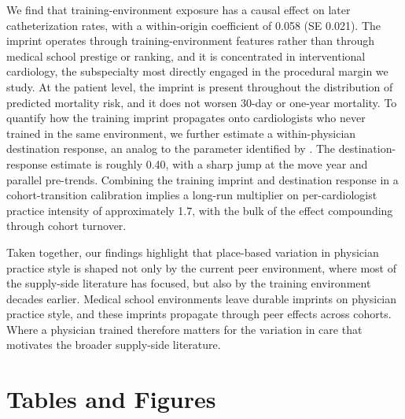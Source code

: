 \documentclass[12pt]{article}
\let\textcite\citet
\begin{document}
We find that training-environment exposure has a causal effect on later catheterization rates, with a within-origin coefficient of 0.058 (SE 0.021). The imprint operates through training-environment features rather than through medical school prestige or ranking, and it is concentrated in interventional cardiology, the subspecialty most directly engaged in the procedural margin we study. At the patient level, the imprint is present throughout the distribution of predicted mortality risk, and it does not worsen 30-day or one-year mortality. To quantify how the training imprint propagates onto cardiologists who never trained in the same environment, we further estimate a within-physician destination response, an analog to the parameter identified by \textcite{molitor2018}. The destination-response estimate is roughly 0.40, with a sharp jump at the move year and parallel pre-trends. Combining the training imprint and destination response in a cohort-transition calibration implies a long-run multiplier on per-cardiologist practice intensity of approximately 1.7, with the bulk of the effect compounding through cohort turnover.

Taken together, our findings highlight that place-based variation in physician practice style is shaped not only by the current peer environment, where most of the supply-side literature has focused, but also by the training environment decades earlier. Medical school environments leave durable imprints on physician practice style, and these imprints propagate through peer effects across cohorts. Where a physician trained therefore matters for the variation in care that motivates the broader supply-side literature.

\clearpage

\begin{singlespace}


\end{singlespace}

\clearpage

\section*{Tables and Figures}

\begin{table}[!h]
\centering
\begin{minipage}[h]{\textwidth}
  \caption[Summary Statistics]{\textbf{Summary Statistics}\footnote{Cardiologist-year observations from the 2008--2018 Medicare fee-for-service panel, restricted to cardiologists treating at least 11 NSTEMI patients in a given year and to graduation cohorts 1983--2006. The residualized cath rate is the volume-weighted mean of patient-level residuals from a linear probability model regressing an indicator for catheterization within two days of NSTEMI admission on age, sex, race, dual eligibility, the 31 Elixhauser comorbidities, and year fixed effects.}}
  \label{tab:summ}
  \centering
  
\end{minipage}
\end{table}
\end{document}
